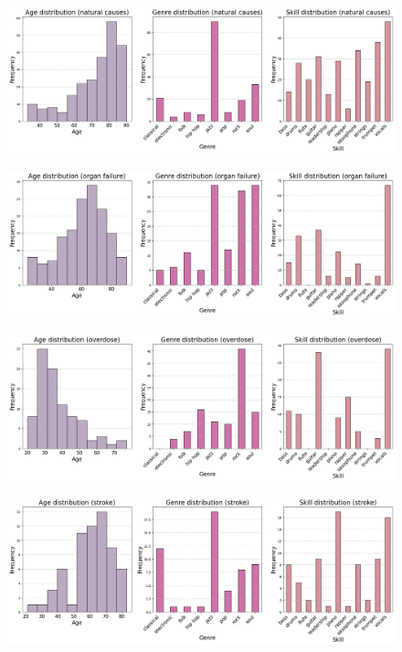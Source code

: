 \documentclass{article}
\begin{document}
\begin{figure}[H]
    \centering
    \includegraphics[width=1\linewidth]{graph_images/death_cause_analysis/natural_causes_distribution.png}
    \label{fig:enter-label}
\end{figure}

\begin{figure}[H]
    \centering
    \includegraphics[width=1\linewidth]{graph_images/death_cause_analysis/organ_failure_distribution.png}
    \label{fig:enter-label}
\end{figure}

\begin{figure}[H]
    \centering
    \includegraphics[width=1\linewidth]{graph_images/death_cause_analysis/overdose_distribution.png}
    \label{fig:enter-label}
\end{figure}

\begin{figure}[H]
    \centering
    \includegraphics[width=1\linewidth]{graph_images/death_cause_analysis/stroke_distribution.png}
    \label{fig:enter-label}
\end{figure}
\end{document}
